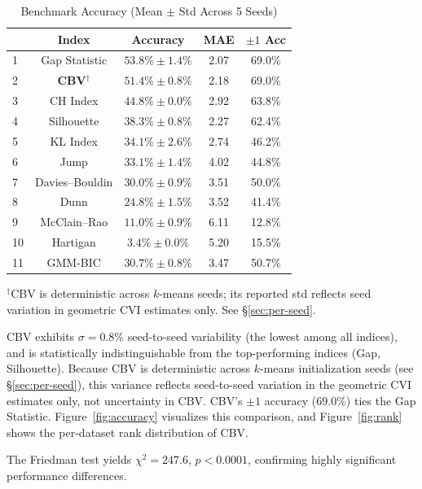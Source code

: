 \documentclass[journal]{IEEEtran}
\begin{document}
\begin{table}[t]
\centering
\caption{Benchmark Accuracy (Mean $\pm$ Std Across 5 Seeds)}
\label{tab:accuracy}

\small
\begin{tabular}{lcccc}
\toprule
 & Index & Accuracy & MAE & $\pm 1$ Acc\\
\midrule
1 & Gap Statistic & $53.8\% \pm 1.4\%$ & 2.07 & 69.0\%\\
2 & \textbf{CBV}$^{\dag}$ & $\mathbf{51.4\% \pm 0.8\%}$ & 2.18 & 69.0\%\\
3 & CH Index & $44.8\% \pm 0.0\%$ & 2.92 & 63.8\%\\
4 & Silhouette & $38.3\% \pm 0.8\%$ & 2.27 & 62.4\%\\
5 & KL Index & $34.1\% \pm 2.6\%$ & 2.74 & 46.2\%\\
6 & Jump & $33.1\% \pm 1.4\%$ & 4.02 & 44.8\%\\
7 & Davies--Bouldin & $30.0\% \pm 0.9\%$ & 3.51 & 50.0\%\\
8 & Dunn & $24.8\% \pm 1.5\%$ & 3.52 & 41.4\%\\
9 & McClain--Rao & $11.0\% \pm 0.9\%$ & 6.11 & 12.8\%\\
10 & Hartigan & $3.4\% \pm 0.0\%$ & 5.20 & 15.5\%\\
11 & GMM-BIC & $30.7\% \pm 0.8\%$ & 3.47 & 50.7\%\\
\bottomrule
\end{tabular}

\vspace{2pt}
\parbox{\columnwidth}{\footnotesize $^{\dag}$CBV is deterministic across $k$-means seeds; its reported std reflects seed variation in geometric CVI estimates only. See \S\ref{sec:per-seed}.}
\end{table}

CBV exhibits $\sigma = 0.8\%$ seed-to-seed variability (the lowest among all indices), and is statistically indistinguishable from the top-performing indices (Gap, Silhouette). Because CBV is deterministic across $k$-means initialization seeds (see \S\ref{sec:per-seed}), this variance reflects seed-to-seed variation in the geometric CVI estimates only, not uncertainty in CBV. CBV's $\pm 1$ accuracy ($69.0\%$) ties the Gap Statistic. Figure~\ref{fig:accuracy} visualizes this comparison, and Figure~\ref{fig:rank} shows the per-dataset rank distribution of CBV.

The Friedman test yields $\chi^2 = 247.6$, $p < 0.0001$, confirming highly significant performance differences.
\end{document}
